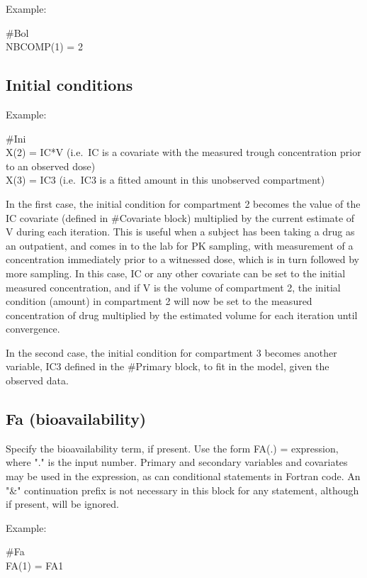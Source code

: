 \documentclass[
]{book}
\begin{document}
Example:

\#Bol\\
NBCOMP(1) = 2

\hypertarget{ini}{%
\subsection{Initial conditions}\label{ini}}

Example:

\#Ini\\
X(2) = IC*V (i.e.~IC is a covariate with the measured trough
concentration prior to an observed dose)\\
X(3) = IC3 (i.e.~IC3 is a fitted amount in this unobserved compartment)

In the first case, the initial condition for compartment 2 becomes the
value of the IC covariate (defined in \#Covariate block) multiplied by
the current estimate of V during each iteration. This is useful when a
subject has been taking a drug as an outpatient, and comes in to the lab
for PK sampling, with measurement of a concentration immediately prior
to a witnessed dose, which is in turn followed by more sampling. In this
case, IC or any other covariate can be set to the initial measured
concentration, and if V is the volume of compartment 2, the initial
condition (amount) in compartment 2 will now be set to the measured
concentration of drug multiplied by the estimated volume for each
iteration until convergence.

In the second case, the initial condition for compartment 3 becomes
another variable, IC3 defined in the \#Primary block, to fit in the
model, given the observed data.

\hypertarget{Fa}{%
\subsection{Fa (bioavailability)}\label{Fa}}

Specify the bioavailability term, if present. Use the form FA(.) =
expression, where "." is the input number. Primary and secondary
variables and covariates may be used in the expression, as can
conditional statements in Fortran code. An "\&" continuation prefix is
not necessary in this block for any statement, although if present, will
be ignored.

Example:

\#Fa\\
FA(1) = FA1

\hypertarget{section}{%
\subsubsection{}\label{section}}
\end{document}
